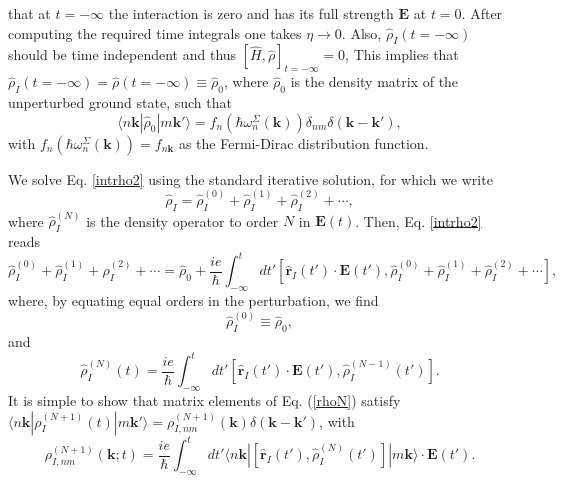 that at $t=-\infty$ the interaction is zero and has its full strength $\mathbf{E}$ 
at $t=0$. After computing the required time integrals one takes
$\eta\to 0$. 
Also, $\hat{\rho}_I(t=-\infty)$ should be time independent and thus 
$[\hat{H},\hat{\rho}]_{t=-\infty}=0$, This implies that 
$\hat{\rho}_I(t=-\infty)=\hat{\rho}(t=-\infty)\equiv\hat{\rho}_0$,
where $\hat{\rho}_0$ is
the density matrix of the unperturbed ground state,
such that
\begin{equation}\label{nrhon}
\langle n\mathbf{k}| \hat{\rho}_{0} |m\mathbf{k}'\rangle = f_{n}(\hbar\omega^{\Sigma}_{n}(\mathbf{k}))\delta_{nm}\delta(\mathbf{k}-\mathbf{k}')
,
\end{equation}
with $f_{n}(\hbar\omega^{\Sigma}_{n}(\mathbf{k}))=f_{n\mathbf{k}}$ as the Fermi-Dirac distribution function.

We solve Eq. \eqref{intrho2} using the standard iterative
solution, for which we write
\begin{equation}\label{rhop}
\hat{\rho}_{I} = \hat{\rho}_{I}^{(0)} + \hat{\rho}_{I}^{(1)} + \hat{\rho}_{I}^{(2)} + \cdots
,
\end{equation}
where $\hat{\rho}_{I}^{(N)}$ is the density operator to order $N$ in $\mathbf{E}(t)$.
Then, Eq. \eqref{intrho2} reads
\begin{equation}\label{intrho3}
\hat{\rho}_{I}^{(0)} + \hat{\rho}_{I}^{(1)} + \hat{\rho}_{I}^{(2)} + \cdots
= \hat{\rho}_{0}
+
\frac{ie}{\hbar}\int_{-\infty}^t dt'[\hat{\mathbf{r}}_I(t')\cdot\mathbf{E}(t'),
\hat{\rho}_I^{(0)}+\hat{\rho}_I^{(1)}+\hat{\rho}_I^{(2)}+\cdots
]
,
\end{equation}
where, by equating equal orders in the perturbation, we find
\begin{equation}\label{rho0}
\hat{\rho}_I^{(0)}\equiv\hat{\rho}_0
,
\end{equation}
and
\begin{equation}\label{rhoN}
\hat{\rho}_I^{(N)}(t)=
\frac{ie}{\hbar}
\int_{-\infty}^t dt'[\hat{\mathbf{r}}_I(t')\cdot\mathbf{E}(t'),\hat{\rho}^{(N-1)}_I(t')].
\end{equation}
It is simple to show that matrix elements of Eq. (\ref{rhoN}) satisfy
$\langle n\mathbf{k}| \rho_I^{(N+1)}(t) |m\mathbf{k}'\rangle = \rho^{(N+1)}_{I,nm}(\mathbf{k})\delta(\mathbf{k}-\mathbf{k}')$,
with
\begin{equation}\label{rtilde}
\rho^{(N+1)}_{I,nm}(\mathbf{k};t)
=\frac{ie}{\hbar}\int_{-\infty}^t dt'
\langle n\mathbf{k}|
[\hat{\mathbf{r}}_I(t'),\hat{\rho}^{(N)}_I(t')]
|m\mathbf{k}\rangle
\cdot\mathbf{E}(t')
.
\end{equation}

